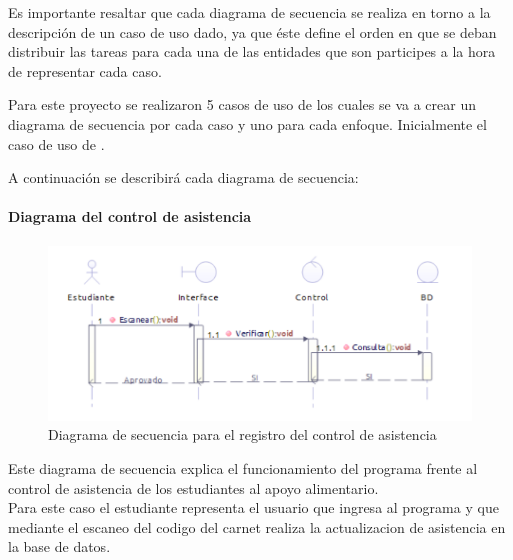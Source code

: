 Es importante resaltar que cada diagrama de secuencia se realiza en torno a la descripción de un caso de uso dado, ya que éste define el orden en que se deban distribuir las tareas para cada una de las entidades que son participes a la hora de representar cada caso.

Para este proyecto se realizaron 5 casos de uso de los cuales se va a crear un diagrama de secuencia por cada caso y uno para cada enfoque. Inicialmente el caso de uso de .

A continuación se describirá cada diagrama de secuencia:

\paragraph{Diagrama del control de asistencia}

\begin{figure}[H]
	\centering
	\includegraphics[width=1\linewidth]{parte2/imgs/DiagramaSecuencia/Asistencia}
	\caption[Diagrama de secuencia de registro de Asistencia]{Diagrama de secuencia para el registro del control de asistencia}
	\label{fig:diagramadesecuencia1}
\end{figure}
Este diagrama de secuencia explica el funcionamiento del programa frente al control de asistencia de los estudiantes al apoyo alimentario.
\\
Para este caso el estudiante representa el usuario que ingresa al programa y que mediante el escaneo del codigo del carnet realiza la actualizacion de asistencia en la base de datos.

 





